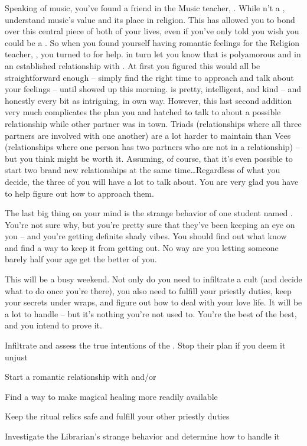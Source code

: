 \documentclass[char]{GL2020}
\begin{document}
Speaking of music, you’ve found a friend in the Music teacher, \cMusic{}. While \cMusic{\they} \cMusic{\are}n’t a \cMusic{\cleric} \cMusic{\themself}, \cMusic{\they} understand\cMusic{\plural} music’s value and its place in religion.  This has allowed you to bond over this central piece of both of your lives, even if you’ve only told \cMusic{\them} you wish you could be a \cInterpol{\cleric}. So when you found yourself having romantic feelings for the Religion teacher, \cBeetle{}, you turned to \cMusic{} for help. \cMusic{} in turn let you know that \cBeetle{} is polyamorous and in an established relationship with \cJuniorStatesman{}. At first you figured this would all be straightforward enough -- simply find the right time to approach \cBeetle{} and talk about your feelings -- until \cJuniorStatesman{} showed up this morning. \cJuniorStatesman{} is pretty, intelligent, and kind -- and honestly every bit as intriguing, in \cJuniorStatesman{\their} own way. However, this last second addition very much complicates the plan you and \cMusic{} hatched to talk to \cBeetle{} about a possible relationship while \cBeetle{\their} other partner was in town. Triads (relationships where all three partners are involved with one another) are a lot harder to maintain than Vees (relationships where one person has two partners who are not in a relationship) -- but you think \cJuniorStatesman{} might be worth it. Assuming, of course, that it’s even possible to start two brand new relationships at the same time\ldots Regardless of what you decide, the three of you will have a lot to talk about. You are very glad you have \cMusic{} to help figure out how to approach them.

The last big thing on your mind is the strange behavior of one \pFarm{} student named \cLibAssist{}. You’re not sure why, but you’re pretty sure that they’ve been keeping an eye on you -- and you’re getting definite shady vibes. You should find out what \cLibAssist{\they} know\cLibAssist{\plural} and find a way to keep it from getting out. No way are you letting someone barely half your age get the better of you.

This will be a busy weekend. Not only do you need to infiltrate a cult (and decide what to do once you’re there), you also need to fulfill your priestly duties, keep your secrets under wraps, and figure out how to deal with your love life. It will be a lot to handle -- but it’s nothing you’re not used to. You’re the best of the best, and you intend to prove it.


\begin{itemz}[Goals]
	\item Infiltrate and assess the true intentions of the \pGoaties{}. Stop their plan if you deem it unjust
	\item Start a romantic relationship with \cBeetle{} and/or \cJuniorStatesman{}
	\item Find a way to make magical healing more readily available
	\item Keep the ritual relics safe and fulfill your other priestly duties
\item Investigate the Librarian’s strange behavior and determine how to handle it
\end{itemz}
\end{document}
